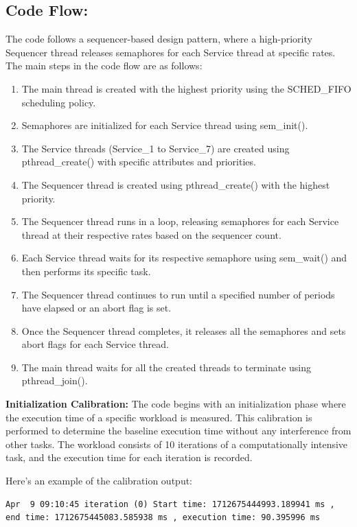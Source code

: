 \documentclass[a4paper,11pt]{article}%
\newenvironment{qanda}{\setlength{\parindent}{0pt}}{\bigskip}
\begin{document}
\begin{qanda}
\begin{enumerate}
			\subsection{Code Flow:}
			The code follows a sequencer-based design pattern, where a high-priority Sequencer thread releases semaphores for each Service thread at specific rates. The main steps in the code flow are as follows:
			\begin{enumerate}
				\item The main thread is created with the highest priority using the SCHED\_FIFO scheduling policy.
				\item Semaphores are initialized for each Service thread using sem\_init().
				\item The Service threads (Service\_1 to Service\_7) are created using pthread\_create() with specific attributes and priorities.
				\item The Sequencer thread is created using pthread\_create() with the highest priority.
				\item The Sequencer thread runs in a loop, releasing semaphores for each Service thread at their respective rates based on the sequencer count.
				\item Each Service thread waits for its respective semaphore using sem\_wait() and then performs its specific task.
				\item The Sequencer thread continues to run until a specified number of periods have elapsed or an abort flag is set.
				\item Once the Sequencer thread completes, it releases all the semaphores and sets abort flags for each Service thread.
				\item The main thread waits for all the created threads to terminate using pthread\_join().
			\end{enumerate}

			\textbf{Initialization Calibration:}
			The code begins with an initialization phase where the execution time of a specific workload is measured. This calibration is performed to determine the baseline execution time without any interference from other tasks. The workload consists of 10 iterations of a computationally intensive task, and the execution time for each iteration is recorded.

			Here's an example of the calibration output:
			\begin{lstlisting}
Apr  9 09:10:45 iteration (0) Start time: 1712675444993.189941 ms , 
end time: 1712675445083.585938 ms , execution time: 90.395996 ms


\end{lstlisting}
\end{enumerate}
\end{qanda}
\end{document}
